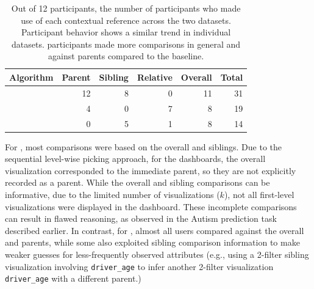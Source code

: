 \begin{table}[h!]
\hspace{-10pt}
\centering
	\begin{tabular}{|l|rrrr|r|}
	\hline
	 \small{Algorithm}   &    \small{Parent} &   \small{Sibling} &   \small{Relative} & \small{Overall} &   \small{Total} \\
	\hline
	 \small{\system}     &    \cellcolor{blue!25} 12 &       8 &     0 &  11 &      \cellcolor{blue!25} 31 \\
	 \small{\cluster}     &         4 &        0 &         7 &          8 &      19 \\
	 \small{\BFS}         &         0 &        5 &         1 &          8 &      14 \\
	\hline
	\end{tabular}
\caption{Out of 12 participants, the number of participants who made use of each contextual reference across the two datasets. Participant behavior shows a similar trend in individual datasets. \system participants made more comparisons in general and against parents compared to the baseline.}
\label{table:contextualReferenceCount}
\end{table}
\par For \BFS, most comparisons were based on the overall and siblings. Due to the sequential level-wise picking approach, for the \BFS dashboards, the overall visualization corresponded to the immediate parent, so they are not explicitly recorded as a parent. While the overall and sibling comparisons can be informative, due to the limited number of visualizations ($k$), not all first-level visualizations were displayed in the dashboard. These incomplete comparisons can result in flawed reasoning, as observed in the Autism prediction task described earlier. In contrast, for \system, almost all users compared against the overall and parents, while some also exploited sibling comparison information to make weaker guesses for less-frequently observed attributes (e.g., using a 2-filter sibling visualization involving \texttt{driver\_age} to infer another 2-filter visualization \texttt{driver\_age} with a different parent.)
